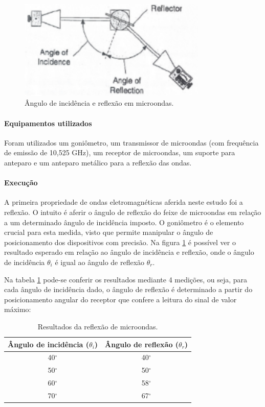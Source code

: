 \documentclass[12pt]{article}
\begin{document}
\begin{figure}[H]
  \centering
  \includegraphics[width=0.8\textwidth]{img/reflexao.png}
  \caption{Ângulo de incidência e reflexão em microondas.}
  \label{fig:img/reflexao.png}
\end{figure}

\paragraph{Equipamentos utilizados}
Foram utilizados um goniômetro, um transmissor de microondas (com
frequência de emissão de 10,525 GHz), um receptor de microondas, um
suporte para anteparo e um anteparo metálico para a reflexão das ondas.

\paragraph{Execução}
A primeira propriedade de ondas eletromagnéticas aferida neste estudo
foi a reflexão. O intuito é aferir o ângulo de reflexão do feixe de
microondas em relação a um determinado ângulo de incidência imposto.
O goniômetro é o elemento crucial para esta medida, visto que permite
manipular o ângulo de posicionamento dos dispositivos com precisão. Na
figura \ref{fig:img/reflexao.png} é possível ver o resultado esperado
em relação ao ângulo de incidência e reflexão, onde o ângulo de
incidência $\theta_i$ é igual ao ângulo de reflexão $\theta_r$.

Na tabela \ref{tab:reflexao} pode-se conferir os resultados mediante 4
medições, ou seja, para cada ângulo de incidência dado, o ângulo de
reflexão é determinado a partir do posicionamento angular do receptor
que confere a leitura do sinal de valor máximo:
\begin{table}[H]
  \centering
  \begin{tabular}{|c|c|}
    \hline
    Ângulo de incidência ($\theta_i$) & Ângulo de reflexão ($\theta_r$) \\
    \hline
    40$^\circ$ & 40$^\circ$ \\
    50$^\circ$ & 50$^\circ$ \\
    60$^\circ$ & 58$^\circ$ \\
    70$^\circ$ & 67$^\circ$ \\
    \hline
  \end{tabular}
  \caption{Resultados da reflexão de microondas.}
  \label{tab:reflexao}
\end{table}
\end{document}
